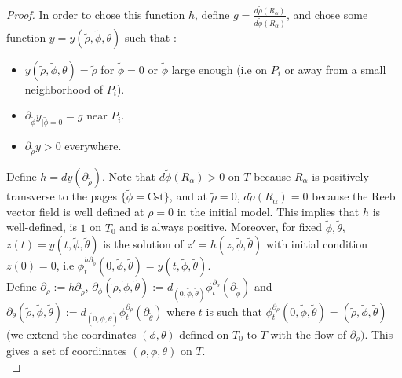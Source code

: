 \documentclass[../main.tex]{subfiles}
\begin{document}
\begin{proof}
In order to chose this function $h$, define $g = \frac{d\tilde{\rho}(R_\alpha)}{d\tilde{\phi}(R_\alpha)}$, and chose some function $y = y(\tilde{\rho},\tilde{\phi},\theta)$ such that :
\begin{itemize}
    \item $y(\tilde{\rho},\tilde{\phi},\theta) = \tilde{\rho}$ for $\tilde{\phi} = 0$ or $\tilde{\phi}$ large enough (i.e on $P_i$ or away from a small neighborhood of $P_i$).
    \item $\partial_{\tilde{\phi}}y_{|\tilde{\phi} = 0} = g$ near $P_i$.
    \item $\partial_{\tilde{\rho}}y > 0$ everywhere.
\end{itemize}

Define $h = dy(\partial_{\tilde{\rho}})$. Note that $d\tilde{\phi}(R_\alpha) > 0$ on $T$ because $R_\alpha$ is positively transverse to the pages $\{\tilde{\phi} = \text{Cst}\}$, and at $\tilde{\rho} = 0$, $d\tilde{\rho}(R_\alpha) = 0$ because the Reeb vector field is well defined at $\rho = 0$ in the initial model. This implies that $h$ is well-defined, is $1$ on $T_0$ and is always positive. Moreover, for fixed $\tilde{\phi},\tilde{\theta}$, $z(t) = y(t,\tilde{\phi},\tilde{\theta})$ is the solution of $z' = h(z,\tilde{\phi},\tilde{\theta})$ with initial condition $z(0) = 0$, i.e $\phi_t^{h\partial_{\tilde{\rho}}}(0,\tilde{\phi},\tilde{\theta}) = y(t,\tilde{\phi},\tilde{\theta})$.\\

Define $\partial_\rho := h\partial_{\tilde{\rho}}$, $\partial_\phi(\tilde{\rho},\tilde{\phi},\tilde{\theta}) := d_{(0,\tilde{\phi},\tilde{\theta})}\phi_t^{\partial_\rho}(\partial_{\tilde{\phi}})$ and $\partial_\theta(\tilde{\rho},\tilde{\phi},\tilde{\theta}) := d_{(0,\tilde{\phi},\tilde{\theta})}\phi_t^{\partial_\rho}(\partial_{\tilde{\theta}})$ where $t$ is such that $\phi_t^{\partial_\rho}(0,\tilde{\phi},\tilde{\theta}) = (\tilde{\rho},\tilde{\phi},\tilde{\theta})$ (we extend the coordinates $(\phi,\theta)$ defined on $T_0$ to $T$ with the flow of $\partial_\rho)$. This gives a set of coordinates $(\rho,\phi,\theta)$ on $T$.\\


\end{proof}
\end{document}
